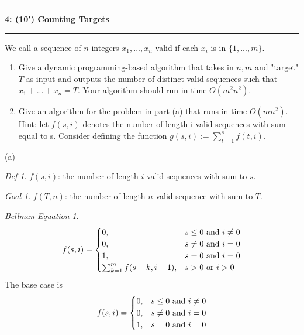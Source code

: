 \documentclass[10.5pt]{article}
\newcommand\question[2]{\vspace{.25in}\hrule\textbf{#1: #2}\vspace{.5em}\hrule\vspace{.10in}}
\newenvironment{main idea}{\textbf{Main Idea: }}{}
\theoremstyle{remark}
\newtheorem*{define}{Def}
\newtheorem*{goal}{Goal}
\newtheorem*{bellman}{Bellman Equation}
\begin{document}
\question{4}{(10') Counting Targets}
We call a sequence of $n$ integers $x_1, ... ,x_n$ valid if each $x_i$ is in $\{1, ..., m\}$.
\begin{enumerate}
	\item[(a)] Give a dynamic programming-based algorithm that takes in $n, m$ and "target" $T$ as input
	      and outputs the number of distinct valid sequences such that $x_1 + ... + x_n = T$. Your
	      algorithm should run in time $O(m^2n^2)$.
	\item[(b)] Give an algorithm for the problem in part (a) that runs in time $O(mn^2)$.
	      \\
	      Hint: let $f(s, i)$ denotes the number of length-i valid sequences with sum equal to s.
	      Consider defining the function $g(s, i) :=\sum^s_{t=1} f(t, i).$
\end{enumerate}
(a)\\
\begin{main idea}
\begin{define}
	\(f(s, i)\): the number of length-\(i\) valid sequences with sum to \(s\).
\end{define}
\begin{goal}
	\(f(T, n)\): the number of length-\(n\) valid sequence with sum to \(T\).
\end{goal}
\begin{bellman}
	\[
		f(s, i) =
		\begin{cases}
			0,                              & s \le 0 \textup{ and } i \ne 0 \\
			0,                              & s\ne 0 \textup{ and } i = 0    \\
			1,                              & s = 0 \textup{ and } i = 0     \\
			\sum_{k = 1}^m f(s - k, i - 1), & s > 0 \textup{ or } i > 0
		\end{cases}
	\]
	The base case is
	\[
		f(s, i) = 	\begin{cases}
			0, & s \le 0 \textup{ and } i \ne 0 \\
			0, & s\ne 0 \textup{ and } i = 0    \\
			1, & s = 0 \textup{ and } i = 0     \\
		\end{cases}
	\]
\end{bellman}
\end{main idea}
\newpage
\end{document}
